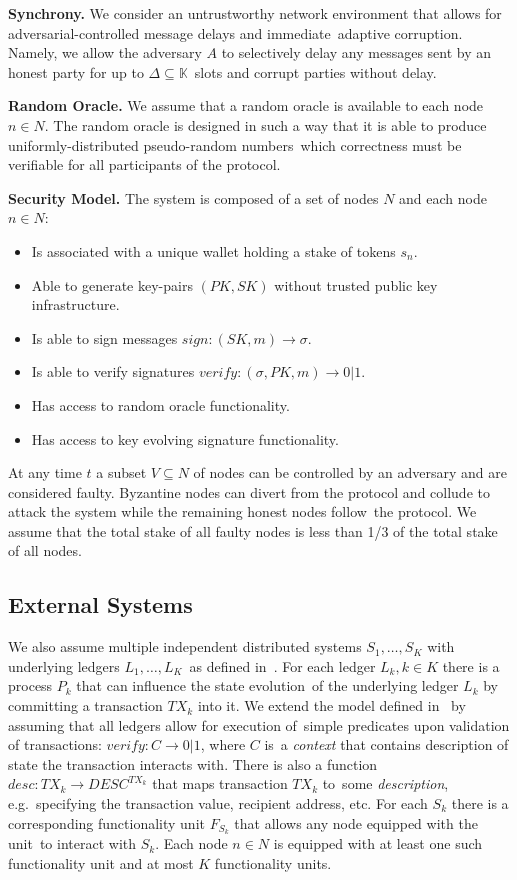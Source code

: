 \textbf{Synchrony.}
We consider an untrustworthy network environment that allows for adversarial-controlled message delays and immediate\
adaptive corruption.
Namely, we allow the adversary $A$ to selectively delay any messages sent by an honest party for up to $\Delta \subseteq \mathbb{K}$\
slots and corrupt parties without delay.

\textbf{Random Oracle.}
We assume that a random oracle is available to each node $n \in N$.
The random oracle is designed in such a way that it is able to produce uniformly-distributed pseudo-random numbers\
which correctness must be verifiable for all participants of the protocol.

\textbf{Security Model.}\label{subsec:security-model.}
The system is composed of a set of nodes $N$ and each node $n \in N$:
\begin{itemize}
    \item Is associated with a unique wallet holding a stake of tokens $s_n$.
    \item Able to generate key-pairs ${(PK, SK)}$ without trusted public key infrastructure.
    \item Is able to sign messages ${sign: (SK, m) \rightarrow \sigma}$.
    \item Is able to verify signatures ${verify: (\sigma, PK, m) \rightarrow 0 | 1}$.
    \item Has access to random oracle functionality.
    \item Has access to key evolving signature functionality.
\end{itemize}

At any time $t$ a subset ${V \subseteq N}$ of nodes can be controlled by an adversary and are considered faulty.
Byzantine nodes can divert from the protocol and collude to attack the system while the remaining honest nodes follow\
the protocol.
We assume that the total stake of all faulty nodes is less than 1/3 of the total stake of all nodes.

\subsection{External Systems}\label{subsec:external-systems.}
We also assume multiple independent distributed systems ${S_1, \dots, S_K}$ with underlying ledgers ${L_1, \dots, L_K}$\
as defined in~\cite{cryptoeprint:2019/1128}.
For each ledger ${L_k, k \in K}$ there is a process $P_k$ that can influence the state evolution\
of the underlying ledger $L_k$ by committing a transaction $TX_k$ into it.
We extend the model defined in~\cite{cryptoeprint:2019/1128} by assuming that all ledgers allow for execution of\
simple predicates upon validation of transactions: ${verify: C \rightarrow 0 | 1}$, where $C$ is\
a \emph{context} that contains description of state the transaction interacts with.
There is also a function ${desc: TX_k \rightarrow DESC^{TX_k}}$ that maps transaction $TX_k$ to\
some \emph{description}, e.g.\ specifying the transaction value, recipient address, etc.
For each $S_k$ there is a corresponding functionality unit $F_{S_k}$ that allows any node equipped with the unit\
to interact with $S_k$.
Each node $n \in N$ is equipped with at least one such functionality unit and at most $K$ functionality units.
